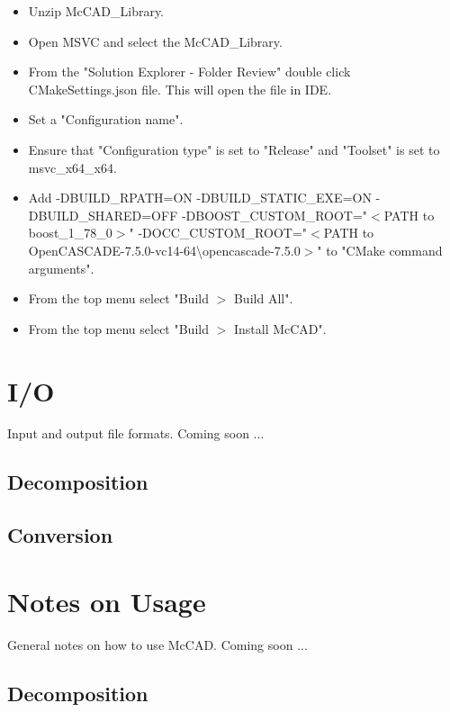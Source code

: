\documentclass[letterpaper, 10 pt]{report}
\begin{document}
\begin{itemize}
\begin{itemize}
		\item Unzip McCAD\_Library.
		\item Open MSVC and select the McCAD\_Library.
		\item From the "Solution Explorer - Folder Review" double click CMakeSettings.json file. This will open the file in IDE. \item Set a "Configuration name". 
		\item Ensure that "Configuration type" is set to "Release" and "Toolset" is set to msvc\_x64\_x64.
		\item Add -DBUILD\_RPATH=ON -DBUILD\_STATIC\_EXE=ON -DBUILD\_SHARED=OFF -DBOOST\_CUSTOM\_ROOT="$<$PATH to boost\_1\_78\_0$>$" -DOCC\_CUSTOM\_ROOT="$<$PATH to OpenCASCADE-7.5.0-vc14-64\textbackslash opencascade-7.5.0$>$" to "CMake command arguments".
		\item From the top menu select "Build $>$ Build All".
		\item From the top menu select "Build $>$ Install McCAD".
	\end{itemize}
  \end{itemize}

\section{I/O}
Input and output file formats. Coming soon ...
\subsection{Decomposition}
\subsection{Conversion}


\section{Notes on Usage}
General notes on how to use McCAD. Coming soon ...
\subsection{Decomposition}
\end{document}
